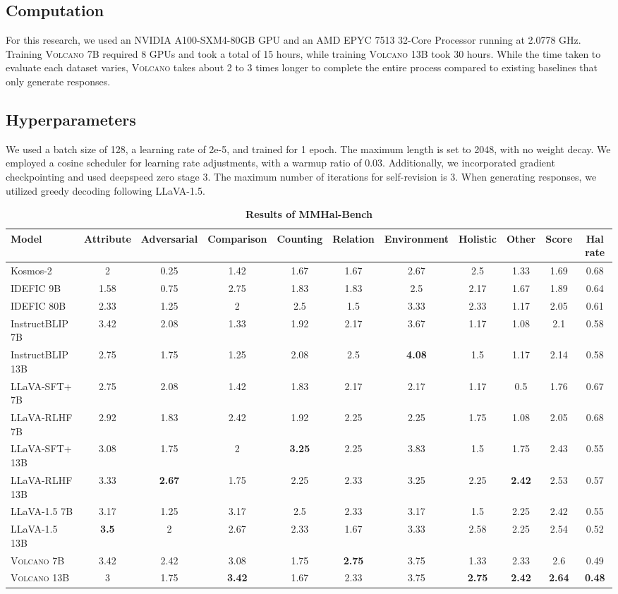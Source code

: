 \documentclass[11pt]{article}
\newcommand{\Ours}{\textsc{Volcano}}
\begin{document}
\subsection{Computation}
For this research, we used an NVIDIA A100-SXM4-80GB GPU and an AMD EPYC 7513 32-Core Processor running at 2.0778 GHz. Training {\Ours} 7B required 8 GPUs and took a total of 15 hours, while training {\Ours} 13B took 30 hours. While the time taken to evaluate each dataset varies, {\Ours} takes about 2 to 3 times longer to complete the entire process compared to existing baselines that only generate responses. \subsection{Hyperparameters}
We used a batch size of 128, a learning rate of 2e-5, and trained for 1 epoch. The maximum length is set to 2048, with no weight decay. We employed a cosine scheduler for learning rate adjustments, with a warmup ratio of 0.03. Additionally, we incorporated gradient checkpointing and used deepspeed zero stage 3. The maximum number of iterations for self-revision is 3. When generating responses, we utilized greedy decoding following LLaVA-1.5.
\begin{table*}[t]
\tiny
\centering
\begin{tabular}{lcccccccc|cc}
\toprule
Model  & Attribute  &	Adversarial  & 	Comparison  &	Counting  &	Relation  &	Environment 	& Holistic	 & Other  & Score  & Hal rate \\
\midrule
Kosmos-2	&	2	&0.25&	1.42&	1.67&	1.67&	2.67&	2.5&	1.33 & 1.69& 	0.68\\
IDEFIC 9B	&	1.58&	0.75&	2.75&	1.83&	1.83&	2.5&	2.17&	1.67 &1.89&	0.64\\
IDEFIC 80B	&	2.33&	1.25&	2&	2.5&	1.5&	3.33&	2.33&	1.17 &2.05&	0.61\\
InstructBLIP 7B	&	3.42&	2.08&	1.33&	1.92&	2.17&	3.67&	1.17&	1.08 &2.1	&0.58\\
InstructBLIP 13B&	2.75&	1.75&	1.25&	2.08&	2.5&	\textbf{4.08}&	1.5&	1.17 &	2.14	&0.58\\
LLaVA-SFT+ 7B&	2.75&	2.08&	1.42&	1.83&	2.17&	2.17&	1.17&	0.5 &	1.76&	0.67\\
LLaVA-RLHF 7B&	2.92&	1.83&	2.42&	1.92&	2.25&	2.25&	1.75&	1.08 &	2.05&	0.68\\
LLaVA-SFT+ 13B&	3.08&	1.75&	2&	\textbf{3.25}&	2.25&	3.83&	1.5&	1.75 & 2.43&	0.55\\
LLaVA-RLHF 13B&	3.33&	\textbf{2.67}&	1.75&	2.25&	2.33&	3.25&	2.25&	\textbf{2.42} &	2.53&	0.57\\
\midrule
LLaVA-1.5 7B&	3.17&	1.25&	3.17&	2.5&	2.33&	3.17&	1.5&	2.25 &	2.42&	0.55\\
LLaVA-1.5 13B&	\textbf{3.5}&	2&	2.67&	2.33&	1.67&	3.33&	2.58&	2.25 &	2.54&	0.52\\
{\Ours} 7B&	3.42&	2.42&	3.08&	1.75&	\textbf{2.75}&	3.75&	1.33&	2.33 &	2.6&	0.49\\
{\Ours} 13B&	3&	1.75&	\textbf{3.42}&	1.67&	2.33&	3.75&	\textbf{2.75}&	\textbf{2.42} &	\textbf{2.64}&	\textbf{0.48}\\
\bottomrule
\end{tabular}
\caption{\textbf{Results of MMHal-Bench}}
\label{tab:Table6}
\end{table*}
\end{document}
